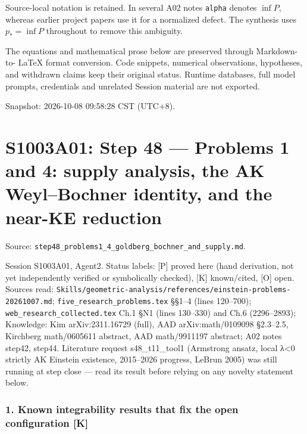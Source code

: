 \documentclass[
  10pt,
]{report}
\begin{document}
Source-local notation is retained. In several A02 notes \texttt{alpha}
denotes \(\inf P\), whereas earlier project papers use it for a
normalized defect. The synthesis uses \(p_* = \inf P\) throughout to
remove this ambiguity.

The equations and mathematical prose below are preserved through
Markdown-to- LaTeX format conversion. Code snippets, numerical
observations, hypotheses, and withdrawn claims keep their original
status. Runtime databases, full model prompts, credentials and unrelated
Session material are not exported.

Snapshot: 2026-10-08 09:58:28 CST (UTC+8).

\hypertarget{s1003a01-step-48-problems-1-and-4-supply-analysis-the-ak-weylbochner-identity-and-the-near-ke-reduction}{%
\chapter{S1003A01: Step 48 --- Problems 1 and 4: supply analysis, the AK
Weyl--Bochner identity, and the near-KE
reduction}\label{s1003a01-step-48-problems-1-and-4-supply-analysis-the-ak-weylbochner-identity-and-the-near-ke-reduction}}

Source:
\texttt{step48\_problems1\_4\_goldberg\_bochner\_and\_supply.md}.

Session S1003A01, Agent2. Status labels: {[}P{]} proved here (hand
derivation, not yet independently verified or symbolically checked),
{[}K{]} known/cited, {[}O{]} open. Sources read:
\texttt{Skills/geometric-analysis/references/einstein-problems-20261007.md};
\texttt{five\_research\_problems.tex} §§1--4 (lines 120--700);
\texttt{web\_research\_collected.tex} Ch.1 §N1 (lines 130--330) and Ch.6
(2296--2893); Knowledge: Kim arXiv:2311.16729 (full), AAD
arXiv:math/0109098 §2.3--2.5, Kirchberg math/0605611 abstract, AAD
math/9911197 abstract; A02 notes step42, step44. Literature request
s48\_t11\_tool1 (Armstrong ansatz, local λ\textless0 strictly AK
Einstein existence, 2015--2026 progress, LeBrun 2005) was still running
at step close --- read its result before relying on any novelty
statement below.

\hypertarget{known-integrability-results-that-fix-the-open-configuration-k}{%
\subsection{1. Known integrability results that fix the open
configuration
{[}K{]}}\label{known-integrability-results-that-fix-the-open-configuration-k}}
\end{document}
